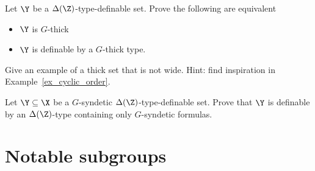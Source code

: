 
\begin{exercise}\label{ex_thick_types}
  Let $\Y$ be a $\Delta(\Z)$-type-definable set.
  Prove the following are equivalent
  \begin{itemize}
    \item[1.] $\Y$ is $G$-thick
    \item[2.] $\Y$ is definable by a $G$-thick type.
  \end{itemize}
\end{exercise}

\begin{exercise}
  Give an example of a thick set that is not wide.
  Hint: find inspiration in Example~\ref{ex_cyclic_order}.
\end{exercise}

\begin{exercise}\label{ex_syndetic_type_vs_formulas}
  Let $\Y\subseteq\X$ be a $G$-syndetic $\Delta(\Z)$-type-definable set.
  Prove that $\Y$ is definable by an $\Delta(\Z)$-type containing only $G$-syndetic formulas.
\end{exercise}



\section{Notable subgroups}\label{G0}
\def\medrel#1{\parbox[t]{5ex}{$\displaystyle\hfil #1$}}
\def\ceq#1#2#3{\parbox[t]{12ex}{$\displaystyle #1$}\medrel{#2}{$\displaystyle #3$}}

